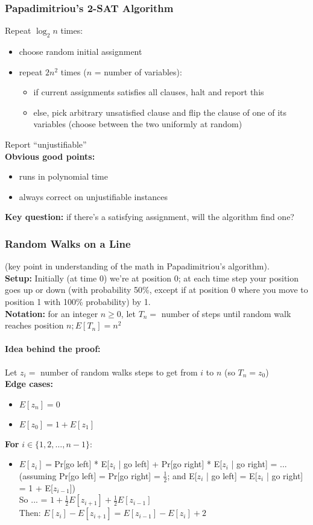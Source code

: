 \documentclass{scrartcl}
\begin{document}
\subsubsection{Papadimitriou's 2-SAT Algorithm}
\label{sec:19-5-1}
Repeat $\log_2 n$ times:
\begin{itemize}
\item choose random initial assignment
\item repeat $2n^2$ times ($n$ = number of variables):
  \begin{itemize}
  \item if current assignments satisfies all clauses, halt and report this
  \item else, pick arbitrary unsatisfied clause and flip the clause of one of its variables (choose between the two uniformly at random)
  \end{itemize}
\end{itemize}
Report ``unjustifiable''\\
{\bf Obvious good points:}
\begin{itemize}
\item runs in polynomial time
\item always correct on unjustifiable instances
\end{itemize}
{\bf Key question:} if there's a satisfying assignment, will the algorithm find one?

\subsubsection{Random Walks on a Line}
\label{sec:19-6}
(key point in understanding of the math in Papadimitriou's algorithm).\\
{\bf Setup:} Initially (at time 0) we're at position 0; at each time step your position goes up or down (with probability 50\%, except if at position 0 where you move to position 1 with 100\% probability) by 1.\\
{\bf Notation:} for an integer $n \geq 0$, let $T_n = $ number of steps until random walk reaches position $n; E[T_n] = n^2$
\paragraph{ Idea behind the proof:} 
Let $z_i = $ number of random walks steps to get from $i$ to $n$ (so $T_n = z_0$)\\
{\bf Edge cases:}
\begin{itemize}
\item $E[z_n] = 0$
\item $E[z_0] = 1 + E[z_1]$
\end{itemize}
{\bf For } $i \in \{1, 2, \dots, n-1\}$:
\begin{itemize}
\item $E[z_i] = $Pr[go left] * E[$z_i$ | go left] + Pr[go right] * E[$z_i$ | go right] = ...\\
(assuming Pr[go left] = Pr[go right] = $\frac12$; and E[$z_i$ | go left] = E[$z_i$ | go right] = 1 + E[$z_{i-1}$]) \\
So ... = $1 + \frac12E[z_{i+1}] + \frac12E[z_{i-1}]$\\
Then: $E[z_i] - E[z_{i+1}] = E[z_{i-1}] - E[z_i] + 2$
\end{itemize}
\end{document}
